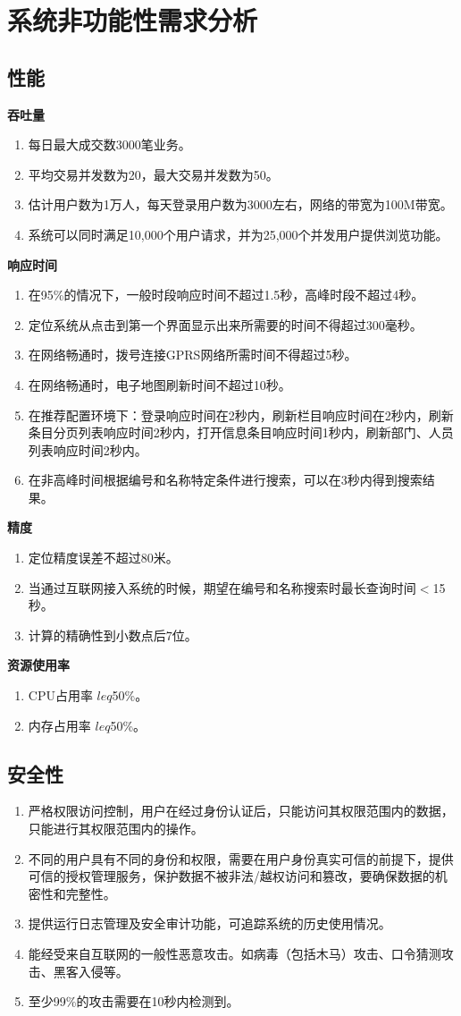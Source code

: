 \section{系统非功能性需求分析}
\subsection{性能}
\textbf{吞吐量}
\begin{enumerate}
\item 每日最大成交数3000笔业务。
\item 平均交易并发数为20，最大交易并发数为50。
\item 估计用户数为1万人，每天登录用户数为3000左右，网络的带宽为100M带宽。
\item 系统可以同时满足10,000个用户请求，并为25,000个并发用户提供浏览功能。
\end{enumerate}
\textbf{响应时间}
\begin{enumerate}
\item 在95\%的情况下，一般时段响应时间不超过1.5秒，高峰时段不超过4秒。
\item 定位系统从点击到第一个界面显示出来所需要的时间不得超过300毫秒。
\item 在网络畅通时，拨号连接GPRS网络所需时间不得超过5秒。
\item 在网络畅通时，电子地图刷新时间不超过10秒。
\item 在推荐配置环境下：登录响应时间在2秒内，刷新栏目响应时间在2秒内，刷新条目分页列表响应时间2秒内，打开信息条目响应时间1秒内，刷新部门、人员列表响应时间2秒内。
\item 在非高峰时间根据编号和名称特定条件进行搜索，可以在3秒内得到搜索结果。
\end{enumerate}
\textbf{精度}
\begin{enumerate}
\item 定位精度误差不超过80米。
\item 当通过互联网接入系统的时候，期望在编号和名称搜索时最长查询时间$<$15秒。
\item 计算的精确性到小数点后7位。
\end{enumerate}
\textbf{资源使用率}
\begin{enumerate}
\item CPU占用率 $leq$50\%。
\item 内存占用率 $leq$50\%。
\end{enumerate}
\subsection{安全性}
\begin{enumerate}
\item 严格权限访问控制，用户在经过身份认证后，只能访问其权限范围内的数据，只能进行其权限范围内的操作。
\item 不同的用户具有不同的身份和权限，需要在用户身份真实可信的前提下，提供可信的授权管理服务，保护数据不被非法/越权访问和篡改，要确保数据的机密性和完整性。
\item 提供运行日志管理及安全审计功能，可追踪系统的历史使用情况。
\item 能经受来自互联网的一般性恶意攻击。如病毒（包括木马）攻击、口令猜测攻击、黑客入侵等。
\item 至少99\%的攻击需要在10秒内检测到。
\end{enumerate}
